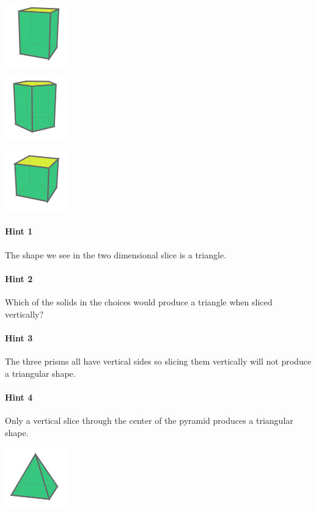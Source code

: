 \documentclass[twocolumn,10pt]{article}
\def\shrinkfactor{0.4}
\begin{document}
 
\includegraphics[scale=\shrinkfactor]{figures/5f94871e71f674049268d58ac56b3de4dfa3a3ba.png}


\includegraphics[scale=\shrinkfactor]{figures/714aa411c23dfb02df032183d703d78050ecb5ae.png}


\includegraphics[scale=\shrinkfactor]{figures/8c9b8f93c15337437fb9789bed7ef67cdfe13e01.png}



\paragraph{Hint 1}The shape we see in the two dimensional slice is a triangle.

\paragraph{Hint 2}Which of the solids in the choices would produce a triangle when sliced vertically?

\paragraph{Hint 3}The three prisms all have vertical sides so slicing them vertically will not produce a triangular shape.

\paragraph{Hint 4}Only a vertical slice through the center of the pyramid produces a triangular shape.


\includegraphics[scale=\shrinkfactor]{figures/49b99cca0c4e580ceaef3d4fd5842ea463191ce8.png}
\end{document}
